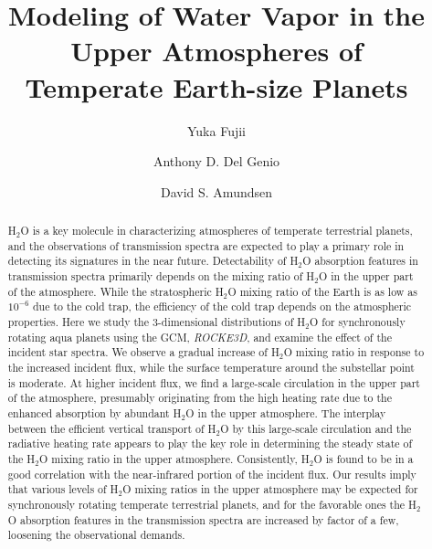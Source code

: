 \documentclass[11pt,numberedappendix,twocolappendix,]{emulateapj}
\def\water{H$_2$O }
\begin{document}
\title{Modeling of Water Vapor in the Upper Atmospheres of 
\\Temperate Earth-size Planets}
\author{Yuka Fujii}
\author{Anthony D. Del Genio}
\author{David S. Amundsen}

\begin{abstract}

\water is a key molecule in characterizing atmospheres of temperate terrestrial planets, and the observations of transmission spectra are expected to play a primary role in detecting its signatures in the near future. 
%
Detectability of \water absorption features in transmission spectra primarily depends on the mixing ratio of \water in the upper part of the atmosphere. 
%
While the stratospheric \water mixing ratio of the Earth is as low as $10^{-6}$ due to the cold trap, the efficiency of the cold trap depends on the atmospheric properties. 
%
Here we study the 3-dimensional distributions of \water for synchronously rotating aqua planets using the GCM, {\it ROCKE3D}, and examine the effect of the incident star spectra. 
%
We observe a gradual increase of \water mixing ratio in response to the increased incident flux, while the surface temperature around the substellar point is moderate. 
%
At higher incident flux, we find a large-scale circulation in the upper part of the atmosphere, presumably originating from the high heating rate due to the enhanced absorption by abundant \water in the upper atmosphere. 
%
The interplay between the efficient vertical transport of \water by this large-scale circulation and the radiative heating rate appears to play the key role in determining the steady state of the \water mixing ratio in the upper atmosphere.  
%
Consistently, \water is found to be in a good correlation with the near-infrared portion of the incident flux. 
%
Our results imply that various levels of \water mixing ratios in the upper atmosphere may be expected for synchronously rotating temperate terrestrial planets, and for the favorable ones the \water absorption features in the transmission spectra are increased by factor of a few, loosening the observational demands. 
%
\end{abstract}
\end{document}
